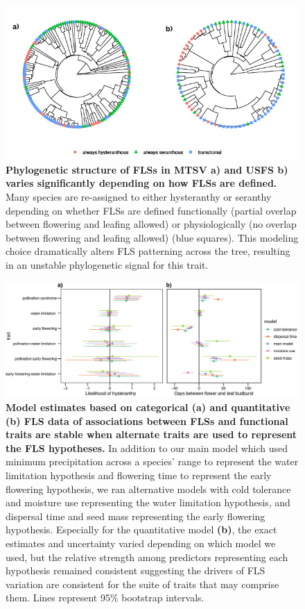\documentclass[11pt]{article}
\begin{document}
\begin{figure}[H]
\centering
\includegraphics[width=\textwidth]{..//..//cicletrees.jpg} 
  \caption{\textbf{Phylogenetic structure of FLSs in MTSV \textbf{a)} and USFS \textbf{b)} varies significantly depending on how FLSs are defined.} Many species are re-assigned to either hysteranthy or seranthy depending on whether FLSs are defined functionally (partial overlap between flowering and leafing allowed) or physiologically (no overlap between flowering and leafing allowed) (blue squares). This modeling choice dramatically alters FLS patterning across the tree, resulting in an unstable phylogenetic signal for this trait.}
    \label{fig:phylogeny}
    \end{figure}

\begin{figure}[H]
\centering
\includegraphics[width=\textwidth]{..//..//alternatepredictors.png} 
  \caption{\textbf{Model estimates based on categorical (a) and quantitative (b) FLS data of associations between FLSs and functional traits are stable when alternate traits are used to represent the FLS hypotheses.} In addition to our main model which used minimum precipitation across a species' range to represent the water limitation hypothesis and flowering time to represent the early flowering hypothesis, we ran alternative models with cold tolerance and moisture use representing the water limitation hypothesis, and dispersal time and seed mass representing the early flowering hypothesis. Especially for the quantitative model \textbf{(b)}, the exact estimates and uncertainty varied depending on which model we used, but the relative strength among predictors representing each hypothesis remained consistent suggesting the drivers of FLS variation are consistent for the suite of traits that may comprise them. Lines represent 95\% bootstrap intervals.} 
    \label{fig:altpreds}
    \end{figure}
    
\end{document}

